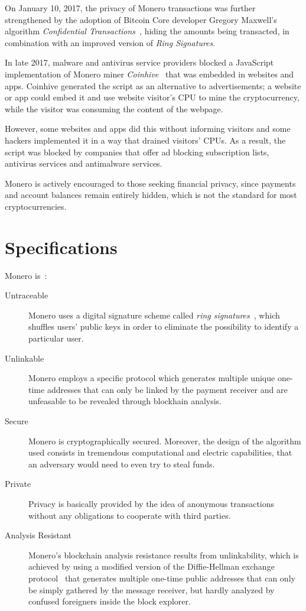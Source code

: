 On January 10, 2017, the privacy of Monero transactions was further strengthened by the adoption of Bitcoin Core developer Gregory Maxwell's algorithm \emph{Confidential Transactions}~\cite{ringCT}, hiding the amounts being transacted, in combination with an improved version of \emph{Ring Signatures}.

In late 2017, malware and antivirus service providers blocked a JavaScript implementation of Monero miner \emph{Coinhive}~\cite{coinhive} that was embedded in websites and apps. Coinhive generated the script as an alternative to advertisements; a website or app could embed it and use website visitor's CPU to mine the cryptocurrency, while the visitor was consuming the content of the webpage.

However, some websites and apps did this without informing visitors and some hackers implemented it in a way that drained visitors' CPUs. As a result, the script was blocked by companies that offer ad blocking subscription lists, antivirus services and antimalware services.

Monero is actively encouraged to those seeking financial privacy, since payments and account balances remain entirely hidden, which is not the standard for most cryptocurrencies.

\section{Specifications}
Monero is~\cite{monero}:
\begin{description}
  \item [Untraceable] Monero uses a digital signature scheme called \emph{ring signatures}~\cite{ringCT}, which shuffles users' public keys in order to eliminate the possibility to identify a particular user.
  \item [Unlinkable] Monero employs a specific protocol which generates multiple unique one-time addresses that can only be linked by the payment receiver and are unfeasable to be revealed through blockhain analysis.
  \item [Secure] Monero is cryptographically secured. Moreover, the design of the algorithm used consists in tremendous computational and electric capabilities, that an adversary would need to even try to steal funds.
  \item [Private] Privacy is basically provided by the idea of anonymous transactions without any obligations to cooperate with third parties.
  \item [Analysis Resistant] Monero's blockchain analysis resistance results from unlinkability, which is achieved by using a modified version of the Diffie-Hellman exchange protocol~\cite{Diffie:2006:NDC:2263321.2269104} that generates multiple one-time public addresses that can only be simply gathered by the message receiver, but hardly analyzed by confused foreigners inside the block explorer.
\end{description}
\pagebreak

